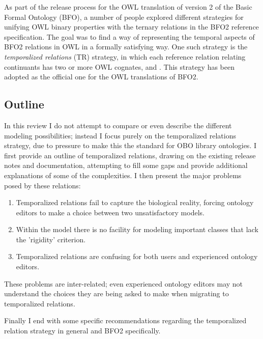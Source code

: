 \documentclass{bioinfo}
\begin{document}
As part of the release process for the OWL translation of version 2 of
the Basic Formal Ontology (BFO)\cite{Grenon2004}, a number of people
explored different strategies for unifying OWL binary properties with
the ternary relations in the BFO2 reference
specification\cite{Grewe}. The goal was to find a way of representing
the temporal aspects of BFO2 relations in OWL in a formally satisfying
way.  One such strategy is the \emph{temporalized relations} (TR)
strategy, in which each reference relation relating continuants has
two or more OWL cognates,  and
. This strategy has been adopted as the official
one for the OWL translations of BFO2\cite{Graz}.

\subsection{Outline}

In this review I do not attempt to compare or even describe the
different modeling possibilities; instead I focus purely on the
temporalized relations strategy, due to pressure to make this the
standard for OBO library ontologies. I first provide an outline of
temporalized relations, drawing on the existing release notes and
documentation, attempting to fill some gaps and provide additional
explanations of some of the complexities. I then present the major
problems posed by these relations:

\begin{enumerate}

\item Temporalized relations fail to capture the biological reality, forcing
  ontology editors to make a choice between two unsatisfactory models.

\item Within the model there is no facility for modeling important classes that lack
  the 'rigidity' criterion.

\item Temporalized relations are confusing for both users and
  experienced ontology editors.
\end{enumerate}

These problems are inter-related; even experienced ontology editors
may not understand the choices they are being asked to make when
migrating to temporalized relations.

Finally I end with some specific recommendations regarding the
temporalized relation strategy in general and BFO2 specifically.
\end{document}
